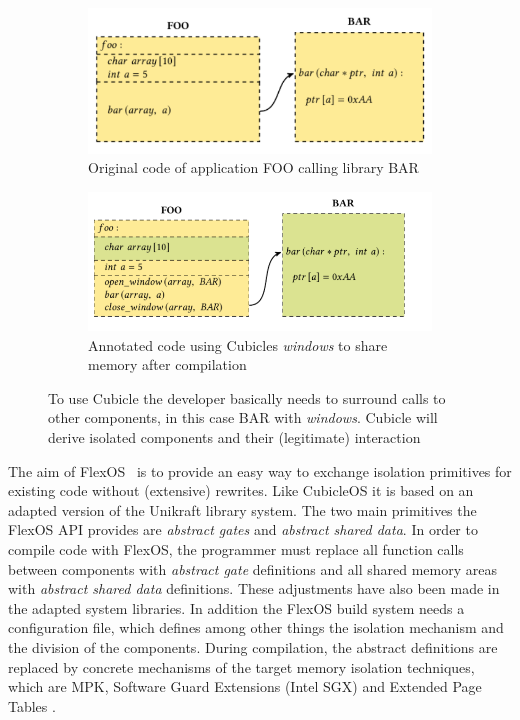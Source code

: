 \begin{figure}[H]
    \begin{subfigure}[b]{0.45\textwidth}
         \includegraphics[width=\textwidth]{figures/cubicle_example_original.png}
         \caption{Original code of application FOO calling library BAR}
         \label{cubicleOriginal}
     \end{subfigure}
     \hfill
     \begin{subfigure}[b]{0.45\textwidth}
         \includegraphics[width=\textwidth]{figures/cubicle_example_windows.png}
         \caption{Annotated code using Cubicles \textit{windows} to share memory after compilation}
         \label{cubicleWindow}
     \end{subfigure}
    \caption{To use Cubicle the developer basically needs to surround calls to other components, in this case BAR with \textit{windows}. Cubicle will derive isolated components and their (legitimate) interaction}
    \label{fig:CubicleAPI}
    \end{figure}

The aim of FlexOS~\cite{lefeuvre2021flexos} is to provide an easy way to exchange isolation primitives for existing code without (extensive) rewrites. Like CubicleOS it is based on an adapted version of the Unikraft library system. The two main primitives the FlexOS API provides are \emph{abstract gates} and \emph{abstract shared data}. In order to compile code with FlexOS, the programmer must replace all function calls between components with \emph{abstract gate} definitions and all shared memory areas with \emph{abstract shared data} definitions. These adjustments have also been made in the adapted system libraries. In addition the FlexOS build system needs a configuration file, which defines among other things the isolation mechanism and the division of the components. During compilation, the abstract definitions are replaced by concrete mechanisms of the target memory isolation techniques, which are MPK, Software Guard Extensions (Intel SGX) and Extended Page Tables \cite{intel64and}. 


